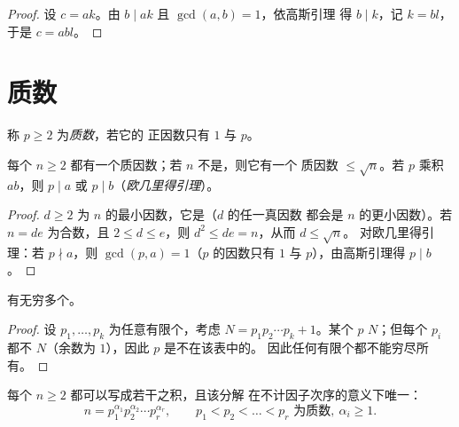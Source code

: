 \begin{proof}
设 $c = ak$。由 $b \mid ak$ 且 $\gcd(a,b)=1$，依高斯引理
得 $b \mid k$，记 $k = bl$，于是 $c = abl$。
\end{proof}

\section{质数}

\begin{definition}[质数]\label{def:g12:arith:prime}
称 $p \geq 2$ 为\emph{质数}，若它的
正因数只有 $1$ 与 $p$。
\end{definition}

\begin{proposition}\label{prop:g12:arith:primedivides}
每个 $n \geq 2$ 都有一个质因数；若 $n$ 不是，则它有一个
质因数 $\leq \sqrt n$。若 $p$ 乘积 $ab$，则
$p \mid a$ 或 $p \mid b$（\emph{欧几里得引理}）。
\end{proposition}

\begin{proof}
$d \geq 2$ 为 $n$ 的最小因数，它是（$d$ 的任一真因数
都会是 $n$ 的更小因数）。若 $n = de$ 为合数，且
$2 \leq d \leq e$，则 $d^2 \leq de = n$，从而 $d \leq \sqrt n$。
对欧几里得引理：若 $p \nmid a$，则 $\gcd(p, a) = 1$（$p$ 的因数只有
$1$ 与 $p$），由高斯引理得 $p \mid b$。
\end{proof}

\begin{theorem}[欧几里得]\label{thm:g12:arith:infiniteprimes}
有无穷多个。
\end{theorem}

\begin{proof}
设 $p_1, \dots, p_k$ 为任意有限个，考虑
$N = p_1 p_2 \cdots p_k + 1$。某个 $p$  $N$；但每个 $p_i$
都不 $N$（余数为 $1$），因此 $p$ 是不在该表中的。
因此任何有限个都不能穷尽所有。
\end{proof}

\begin{theorem}[算术基本定理]\label{thm:g12:arith:fta}
每个 $n \geq 2$ 都可以写成若干之积，且该分解
在不计因子次序的意义下唯一：
\[
n = p_1^{\alpha_1} p_2^{\alpha_2} \cdots p_r^{\alpha_r},
\qquad p_1 < p_2 < \dots < p_r \text{ 为质数},\ \alpha_i \geq 1 .
\]
\end{theorem}

